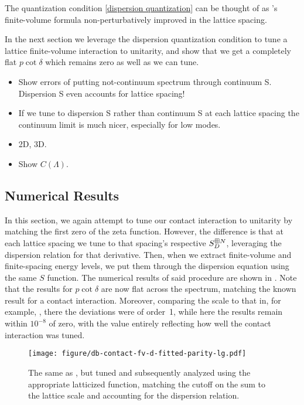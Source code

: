 The quantization condition \eqref{dispersion quantization} can be thought of as \Luscher's finite-volume formula non-perturbatively improved in the lattice spacing. 

In the next section we leverage the dispersion quantization condition to tune a lattice finite-volume interaction to unitarity, and show that we get a completely flat $p \cot \delta$ which remains zero as well as we can tune.

\begin{itemize}
    \item Show errors of putting not-continuum spectrum through continuum S.  Dispersion S even accounts for lattice spacing!
    \item If we tune to dispersion S rather than continuum S at each lattice spacing the continuum limit is much nicer, especially for low modes.
    \item 2D, 3D.
    \item Show $C(\Lambda)$.
\end{itemize}

\subsection{Numerical Results}

In this section, we again attempt to tune our contact interaction to unitarity by matching the first zero of the \Luscher zeta function.
However, the difference is that at each lattice spacing we tune to that spacing's respective $S^{\boxplus N}_D$, leveraging the dispersion relation for that derivative.
Then, when we extract finite-volume and finite-spacing energy levels, we put them through the dispersion equation  using the same $S$ function.
The numerical results of said procedure are shown in .
Note that the results for $p\cot\delta$ are now flat across the spectrum, matching the known result for a contact interaction.
Moreover, comparing the scale to that in, for example, , there the deviations were of order~1, while here the results remain within $10^{-8}$ of zero, with the value entirely reflecting how well the contact interaction was tuned.

\begin{figure}
    \texttt{[image: figure/db-contact-fv-d-fitted-parity-lg.pdf]}
    \caption{The same as , but tuned and subsequently analyzed using the appropriate latticized \Luscher function, matching the cutoff on the sum to the lattice scale and accounting for the dispersion relation.}
    \label{fig:unimproved dispersion}
\end{figure}


